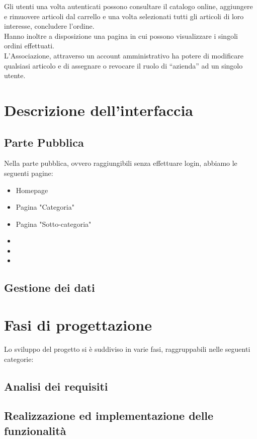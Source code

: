 Gli utenti una volta autenticati possono consultare il catalogo online, aggiungere e rimuovere articoli dal carrello e una volta selezionati tutti gli articoli di loro interesse, concludere l’ordine. \\
Hanno inoltre a disposizione una pagina in cui possono visualizzare i singoli ordini effettuati.\\

L’Associazione, attraverso un account amministrativo ha potere di modificare qualsiasi articolo e di assegnare o revocare il ruolo di “azienda” ad un singolo utente. 

\section{Descrizione dell'interfaccia}
\subsection{Parte Pubblica}
Nella parte pubblica, ovvero raggiungibili senza effettuare login, abbiamo le seguenti pagine:
\begin{itemize}
	\item Homepage
	\item Pagina "Categoria"
	\item Pagina "Sotto-categoria"
	\item
	\item
	\item
\end{itemize}


\subsection{Gestione dei dati}


\section{Fasi di progettazione}

Lo sviluppo del progetto si è suddiviso in varie fasi, raggruppabili nelle seguenti categorie:

\subsection{Analisi dei requisiti}


\subsection{Realizzazione ed implementazione delle funzionalità}

